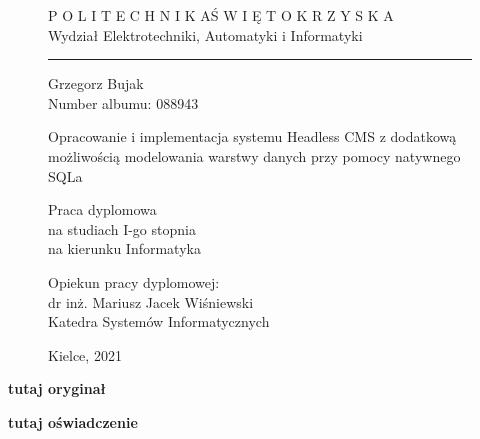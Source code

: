 \begin{figure}
    \arialnarrowbold
    \bfseries

    \centering
    \Large P O L I T E C H N I K A\quad Ś W I Ę T O K R Z Y S K A \\
    Wydział Elektrotechniki, Automatyki i Informatyki\\
    \rule{\linewidth}{1pt}

    \vspace{4cm}

    Grzegorz Bujak\\
    Number albumu: 088943\\
    \vspace{2cm}

    \LARGE Opracowanie i implementacja systemu Headless CMS 
    z dodatkową możliwością modelowania
    warstwy danych przy pomocy natywnego SQLa\\
    \vspace{1cm}

    \large Praca dyplomowa\\
    na studiach I-go stopnia\\
    na kierunku Informatyka\\
    \vspace{4cm}

    \normalfont
    \arialnarrow
    \raggedleft Opiekun pracy dyplomowej:\\
    dr inż. Mariusz Jacek Wiśniewski\\
    Katedra Systemów Informatycznych\\
    \vspace{1.5cm}

    \centering
    Kielce, 2021
\end{figure}

\vspace{1cm}

\afterpage{\null\newpage}
\clearpage

{\centering\bfseries\Huge tutaj oryginał}

\afterpage{\null\newpage}
\clearpage

{\centering\bfseries\Huge tutaj oświadczenie}

\afterpage{\null\newpage}
\clearpage
